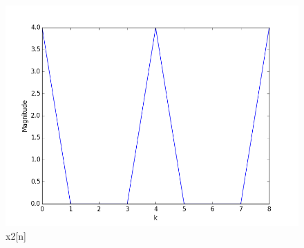 \begin{figure}[h]
  \centering
  \includegraphics[width=\linewidth]{2b_3}
  \caption{x2[n]}
  \label{fig:2b3}
\end{figure}


